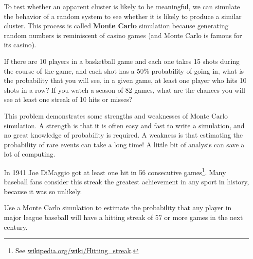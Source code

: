\documentclass[12pt]{book}
\begin{document}
To test whether an apparent
cluster is likely to be meaningful, we can simulate the behavior
of a random system to see whether it is likely to produce a similar
cluster.  This process is called {\bf Monte Carlo} simulation because
generating random numbers is reminiscent of casino games (and Monte
Carlo is famous for its casino).

\begin{ex}

If there are 10 players in a basketball game and each one takes
15 shots during the course of the game, and each shot has a
50\% probability of going in, what is the probability that 
you will see, in a given game, at least one player who
hits 10 shots in a row?  If you watch a season of 82 games,
what are the chances you will see at least one streak of
10 hits or misses?

This problem demonstrates some strengths and weaknesses of Monte
Carlo simulation.  A strength is that it is often easy and fast
to write a simulation, and no great knowledge of probability is
required.  A weakness is that estimating the probability of
rare events can take a long time!  A little bit of analysis can
save a lot of computing.

\end{ex}


\begin{ex}

In 1941 Joe DiMaggio got at least one hit
in 56 consecutive games\footnote{See
  \url{wikipedia.org/wiki/Hitting_streak}.}.  Many baseball fans
consider this streak the greatest achievement in any sport in history,
because it was so unlikely.

Use a Monte Carlo simulation to estimate the probability that
any player in major league baseball will have a hitting streak
of 57 or more games in the next century.

\end{ex}
\end{document}
